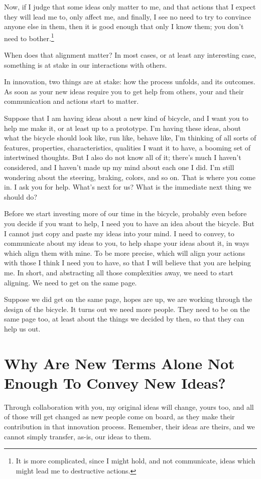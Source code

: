 \documentclass[graybox,envcountchap,sectrefs]{svmono}
\begin{document}
Now, if I judge that some ideas only matter to me, and that actions that I expect they will lead me to, only affect me, and finally, I see no need to try to convince anyone else in them, then it is good enough that only I know them; you don't need to bother.\footnote{It is more complicated, since I might hold, and not communicate, ideas which might lead me to destructive actions.}

When does that alignment matter? In most cases, or at least any interesting case, something is at stake in our interactions with others.

In innovation, two things are at stake: how the process unfolds, and its outcomes. As soon as your new ideas require you to get help from others, your and their communication and actions start to matter. 

Suppose that I am having ideas about a new kind of bicycle, and I want you to help me make it, or at least up to a prototype. I'm having these ideas, about what the bicycle should look like, run like, behave like, I'm thinking of all sorts of features, properties, characteristics, qualities I want it to have, a booming set of intertwined thoughts. But I also do not know all of it; there's much I haven't considered, and I haven't made up my mind about each one I did. I'm still wondering about the steering, braking, colors, and so on. That is where you come in. I ask you for help. What's next for us? What is the immediate next thing we should do?

Before we start investing more of our time in the bicycle, probably even before you decide if you want to help, I need you to have an idea about the bicycle. But I cannot just copy and paste my ideas into your mind. I need to convey, to communicate about my ideas to you, to help shape your ideas about it, in ways which align them with mine. To be more precise, which will align your actions with those I think I need you to have, so that I will believe that you are helping me. In short, and abstracting all those complexities away, we need to start aligning. We need to get on the same page. 

Suppose we did get on the same page, hopes are up, we are working through the design of the bicycle. It turns out we need more people. They need to be on the same page too, at least about the things we decided by then, so that they can help us out.


\section{Why Are New Terms Alone Not Enough To Convey New Ideas?}
\label{c1-s9}
Through collaboration with you, my original ideas will change, yours too, and all of those will get changed as new people come on board, as they make their contribution in that innovation process. Remember, their ideas are theirs, and we cannot simply transfer, as-is, our ideas to them.
\end{document}
